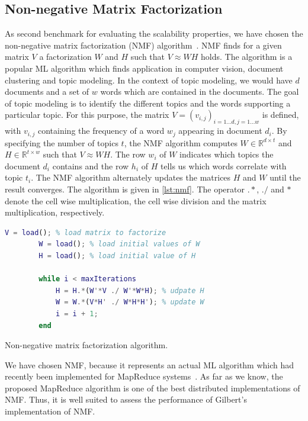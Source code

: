 \subsection{Non-negative Matrix Factorization}
\label{subsec:NMF}

As second benchmark for evaluating the scalability properties, we have chosen the non-negative matrix factorization (NMF) algorithm~\cite{seung:anips2001a}.
NMF finds for a given matrix $V$ a factorization $W$ and $H$ such that $V\approx W H$ holds.
The algorithm is a popular ML algorithm which finds application in computer vision, document clustering and topic modeling.
In the context of topic modeling, we would have $d$ documents and a set of $w$ words which are contained in the documents.
The goal of topic modeling is to identify the different topics and the words supporting a particular topic.
For this purpose, the matrix $V = (v_{i,j})_{i=1\ldots d,j=1\ldots w}$ is defined, with $v_{i,j}$ containing the frequency of a word $w_j$ appearing in document $d_i$.
By specifying the number of topics $t$, the NMF algorithm computes $W\in \mathbb{R}^{d\times t}$ and $H\in \mathbb{R}^{t\times w}$ such that $V \approx W H$.
The row $w_i$ of $W$ indicates which topics the document $d_i$ contains and the row $h_i$ of $H$ tells us which words correlate with topic $t_i$.
The NMF algorithm alternately updates the matrices $H$ and $W$ until the result converges.
The algorithm is given in \cref{lst:nmf}.
The operator $.*$, $./$ and $*$ denote the cell wise multiplication, the cell wise division and the matrix multiplication, respectively.

\begin{listing}[!h]
	\begin{CenteredBox}
		\begin{lstlisting}[language=Matlab]
		V = load(); % load matrix to factorize
		W = load(); % load initial values of W
		H = load(); % load initial value of H

		while i < maxIterations
			H = H.*(W'*V ./ W'*W*H); % udpate H
			W = W.*(V*H' ./ W*H*H'); % update W
			i = i + 1;
		end
		\end{lstlisting}
	\end{CenteredBox}
	\caption{Non-negative matrix factorization algorithm.}
	\label{lst:nmf}
\end{listing}

We have chosen NMF, because it represents an actual ML algorithm which had recently been implemented for MapReduce systems~\cite{liu:2010a}.
As far as we know, the proposed MapReduce algorithm is one of the best distributed implementations of NMF.
Thus, it is well suited to assess the performance of Gilbert's implementation of NMF.

